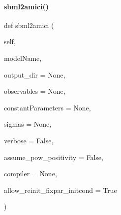 \paragraph{\texorpdfstring{sbml2amici()}{sbml2amici()}}
{\footnotesize\ttfamily def sbml2amici (\begin{DoxyParamCaption}\item[{}]{self,  }\item[{}]{model\+Name,  }\item[{}]{output\+\_\+dir = {\ttfamily None},  }\item[{}]{observables = {\ttfamily None},  }\item[{}]{constant\+Parameters = {\ttfamily None},  }\item[{}]{sigmas = {\ttfamily None},  }\item[{}]{verbose = {\ttfamily False},  }\item[{}]{assume\+\_\+pow\+\_\+positivity = {\ttfamily False},  }\item[{}]{compiler = {\ttfamily None},  }\item[{}]{allow\+\_\+reinit\+\_\+fixpar\+\_\+initcond = {\ttfamily True} }\end{DoxyParamCaption})}


